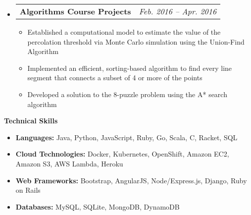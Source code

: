 \documentclass{article}
\makeatletter
\newcommand{\resitem}[1]{
    \item #1
    \vspace{-2pt}
}
\newcommand{\resheading}[1]{{\large \colorbox{mygrey}{\begin{minipage}{\textwidth}{\textbf{#1 \vphantom{p\^{E}}}}\end{minipage}}}}
\newcommand{\ressubheadingproj}[2]{
\begin{tabular*}{6.80in}{l@{\extracolsep{\fill}}r}
    \textbf{#1} & \textit{#2} \\
\end{tabular*}\vspace{-6pt}}
\makeatother
\begin{document}
    \begin{itemize}
        \item\ressubheadingproj
        {Algorithms Course Projects}{Feb. 2016 -- Apr. 2016}
        {\footnotesize
        \begin{itemize}
            \resitem
            {Established a computational model to estimate the value of the percolation
            threshold via Monte Carlo simulation using the Union-Find Algorithm}
            \resitem
            {Implemented an efficient, sorting-based algorithm to find every line segment
            that connects a subset of 4 or more of the points}
            \resitem
            {Developed a solution to the 8-puzzle problem using the A* search algorithm}
        \end{itemize}
        }
    \end{itemize}


    \resheading{Technical Skills}

    \begin{itemize}
        \item {
        \textbf{Languages:}
        \vspace{-0.2cm}
        Java, Python, JavaScript, Ruby, Go, Scala, C, Racket, SQL
        }
        \item {
        \textbf{Cloud Technologies:}
        \vspace{-0.2cm}
        Docker, Kubernetes, OpenShift, Amazon EC2, Amazon S3, AWS Lambda, Heroku
        }
        \item {
        \textbf{Web Frameworks:}
        \vspace{-0.2cm}
        Bootstrap, AngularJS, Node/Express.js, Django, Ruby on Rails
        }
        \item {
        \textbf{Databases:}
        MySQL, SQLite, MongoDB, DynamoDB
        }
    \end{itemize}
\end{document}
